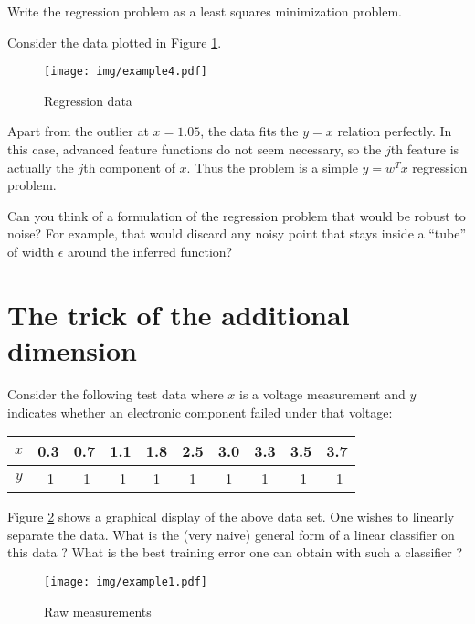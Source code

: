 \documentclass{article}
\begin{document}
\noindent {} Write the regression problem as a least squares minimization problem.

Consider the data plotted in Figure \ref{fig:3}. 
\begin{figure}[h!]
\begin{center}
\texttt{[image: img/example4.pdf]}
\end{center}
\caption{Regression data}
\label{fig:3}
\end{figure}

Apart from the outlier at $x=1.05$, the data fits the $y=x$ relation perfectly.
In this case, advanced feature functions do not seem necessary, so the $j$th feature is actually the $j$th component of $x$. Thus the problem is a simple $y=w^Tx$ regression problem.

\noindent {} Can you think of a formulation of the regression problem that would be robust to noise? For example, that would discard any noisy point that stays inside a ``tube'' of width $\epsilon$ around the inferred function?

\section{The trick of the additional dimension}

Consider the following test data where $x$ is a voltage measurement and $y$ indicates whether an electronic component failed under that voltage:

\begin{tabular}{|c|c|c|c|c|c|c|c|c|c|}
\hline
$x$ & 0.3 & 0.7 & 1.1 & 1.8 & 2.5 & 3.0 & 3.3 & 3.5 & 3.7 \\
\hline
$y$ & -1  & -1  &  -1 &  1  &  1  &  1  & 1   & -1  & -1\\
\hline
\end{tabular}

\noindent {} Figure \ref{fig:1} shows a graphical display of the above data set. One wishes to linearly separate the data. What is the (very naive) general form of a linear classifier on this data ? What is the best training error one can obtain with such a classifier ? 

\begin{figure}[h!]
\begin{center}
\texttt{[image: img/example1.pdf]}
\end{center}
\label{fig:1}
\caption{Raw measurements}
\end{figure}
\end{document}
